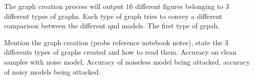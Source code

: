 The graph creation process will output \(16\) different
figures belonging to \(3\) different types of graphs. Each
type of graph tries to convey a different comparison between
the different \ac{qml} models. The first type of grpah.  \

Mention the graph creation (probs reference notebook notes),
state the 3 differents types of graphs created and how to read
them. Accuracy on clean samples with noise model, Accuracy of
noiseless model being attacked, accuracy of noisy models being attacked. \